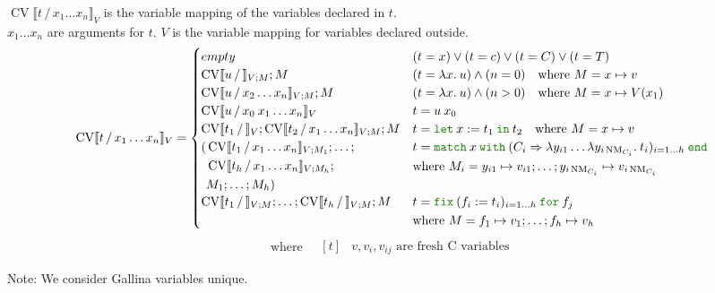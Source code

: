 \documentclass[a4paper,fleqn]{article}
\def\gallina{\textrm{Gallina}}
\newcommand{\kwlet}{\mbox{\color{mygreen}\ttfamily let}}
\newcommand{\kwin}{\mbox{\color{mygreen}\ttfamily in}}
\newcommand{\kwmatch}{\mbox{\color{mygreen}\ttfamily match}}
\newcommand{\kwwith}{\mbox{\color{mygreen}\ttfamily with}}
\newcommand{\kwend}{\mbox{\color{mygreen}\ttfamily end}}
\newcommand{\kwfix}{\mbox{\color{mygreen}\ttfamily fix}}
\newcommand{\kwfor}{\mbox{\color{mygreen}\ttfamily for}}
\newcommand{\lam}[2]{\lambda #1.\:#2}
\newcommand{\lamB}[1]{\lambda #1.\:}
\newcommand{\letin}[3]{\kwlet\:#1:=#2\:\kwin\:#3}
\newcommand{\match}[4]{\kwmatch\:#1\:\kwwith\:(#2 \Rightarrow #3)_{#4}\:\kwend}
\newcommand{\fix}[4]{\kwfix\:(#1 := #2)_{#3}\:\kwfor\:#4}
\DeclareMathOperator{\NM}{NM}
\newcommand{\BRA}[1]{\llbracket #1 \rrbracket}
\DeclareMathOperator{\cvop}{CV}
\newcommand{\cv}[3]{\cvop\BRA{#1\,/\,#2}_{#3}}
\begin{document}
\raggedright
$\cv{t}{x_1\ldots x_n}{V}$ is the variable mapping of the variables declared in $t$. \\
$x_1\ldots x_n$ are arguments for $t$.
$V$ is the variable mapping for variables declared outside.
\[
  \cv{t}{x_1\ldots x_n}{V} =
  \begin{cases}
    empty                                             & (t = x) \vee (t = c) \vee (t = C) \vee (t = T) \\
    \cv{u}{}{V; M}; M                                & (t = \lam{x}{u}) \wedge (n = 0) \quad \text{where}~M = x\mapsto v \\
    \cv{u}{x_2\ldots x_n}{V; M}; M                    & (t = \lam{x}{u}) \wedge (n > 0) \quad \text{where}~M = x\mapsto V(x_1) \\
    \cv{u}{x_0\:x_1\ldots x_n}V                        & t = u\:x_0 \\
    \cv{t_1}{}{V}; \cv{t_2}{x_1\ldots x_n}{V; M}; M    & t = \letin{x}{t_1}{t_2} \quad \text{where}~M = x\mapsto v \\
    \begin{aligned}[t]
      (&\cv{t_1}{x_1\ldots x_n}{V;M_1};\ldots; \\
       &\cv{t_h}{x_1\ldots x_n}{V;M_h}; \\
       &M_1;\ldots;M_h)
    \end{aligned} &                                   \begin{aligned}[t]
                                                        &t = \match{x}{C_i}{\lambda y_{i1}\ldots\lamB{y_{i\NM_{C_i}}}t_i}{i=1\ldots h} \\
                                                        &\text{where}~M_i = y_{i1}\mapsto v_{i1}; \ldots; y_{i\NM_{C_i}}\mapsto v_{i\NM_{C_i}}
                                                      \end{aligned} \\
    \cv{t_1}{}{V;M}; \ldots; \cv{t_h}{}{V;M}; M &    \begin{aligned}[t]
                                                        &t = \fix{f_i}{t_i}{i=1\ldots h}{f_j} \\
                                                        &\text{where}~M = f_1\mapsto v_1;\ldots; f_h\mapsto v_h
                                                      \end{aligned}
  \end{cases}
\]
\[ \text{where} \quad
  \begin{aligned}[t]
    & \text{$v, v_i, v_{ij}$ are fresh C variables}
  \end{aligned}
\]
\raggedright
{\small Note: \quad We consider \gallina{} variables unique.}
\end{document}
